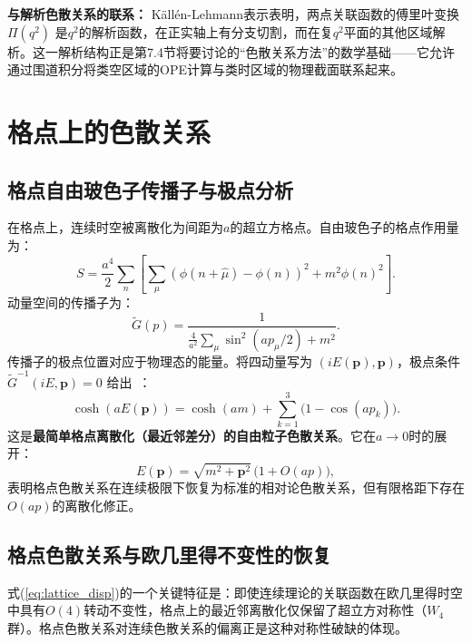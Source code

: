 \documentclass[12pt,a4paper]{ctexart}
\theoremstyle{definition}
\begin{document}
\textbf{与解析色散关系的联系：} K\"all\'en-Lehmann表示表明，两点关联函数的傅里叶变换 $\Pi(q^2)$ 是$q^2$的解析函数，在正实轴上有分支切割，而在复$q^2$平面的其他区域解析。这一解析结构正是第7.4节将要讨论的``色散关系方法''的数学基础——它允许通过围道积分将类空区域的OPE计算与类时区域的物理截面联系起来。

\section{格点上的色散关系}

\subsection{格点自由玻色子传播子与极点分析}

在格点上，连续时空被离散化为间距为$a$的超立方格点。自由玻色子的格点作用量为：
\begin{equation}
    S = \frac{a^4}{2}\sum_n \left[ \sum_\mu (\phi(n+\hat{\mu}) - \phi(n))^2 + m^2\phi(n)^2 \right].
\end{equation}
动量空间的传播子为：
\begin{equation}
    \tilde{G}(p) = \frac{1}{\frac{4}{a^2}\sum_\mu \sin^2(ap_\mu/2) + m^2}.
\end{equation}
传播子的极点位置对应于物理态的能量。将四动量写为 $(iE(\mathbf{p}), \mathbf{p})$，极点条件 $\tilde{G}^{-1}(iE, \mathbf{p}) = 0$ 给出~\cite{GattringerLang2010}：
\begin{equation}\label{eq:lattice_disp}
    \cosh(aE(\mathbf{p})) = \cosh(am) + \sum_{k=1}^3 \bigl(1 - \cos(ap_k)\bigr).
\end{equation}
这是\textbf{最简单格点离散化（最近邻差分）的自由粒子色散关系}。它在$a \to 0$时的展开：
\begin{equation}
    E(\mathbf{p}) = \sqrt{m^2 + \mathbf{p}^2}\,\bigl(1 + O(ap)\bigr),
\end{equation}
表明格点色散关系在连续极限下恢复为标准的相对论色散关系，但有限格距下存在$O(ap)$的离散化修正。

\subsection{格点色散关系与欧几里得不变性的恢复}

式(\ref{eq:lattice_disp})的一个关键特征是：即使连续理论的关联函数在欧几里得时空中具有$O(4)$转动不变性，格点上的最近邻离散化仅保留了超立方对称性（$W_4$群）。格点色散关系对连续色散关系的偏离正是这种对称性破缺的体现。
\end{document}
